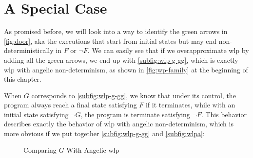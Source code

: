 \section{A Special Case}\label{sec:special} %
As promised before, we will look into a way to identify the green arrows in \autoref{fig:door}, aka the executions that start from initial states but may end non-deterministically in $F$ or $\neg F$. 
We can easily see that if we overapproximate wlp by adding all the green arrows, we end up with \autoref{subfig:wlp-g-gg}, which is exactly wlp with angelic non-determinism, as shown in \autoref{fig:wp-family} at the beginning of this chapter. 

When $G$ corresponds to \autoref{subfig:wlp-g-gg}, we know that under its control, the program always  reach a final state satisfying $F$ if it terminates, while with an initial state satisfying $\neg G$, the program is  terminate satisfying $\neg F$.
This behavior describes exactly the behavior of wlp with angelic non-determinism, which is more obvious if we put together \autoref{subfig:wlp-g-gg} and  \autoref{subfig:wlpa}: 
\begin{figure}[ht]
	\centering
	\hfill 
	
	\label{wlp-g-wlpa}
	\caption{Comparing $G$ With Angelic wlp}
\end{figure}

